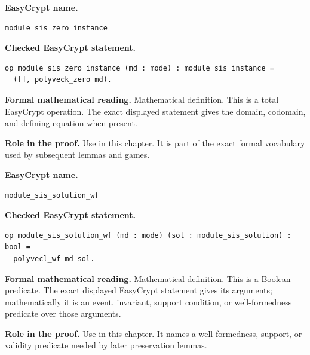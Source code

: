 \begin{formaldefinition}
\noindent\textbf{EasyCrypt name.}
\begin{lstlisting}[language=EasyCrypt,basicstyle=\ttfamily\scriptsize]
module_sis_zero_instance
\end{lstlisting}
\noindent\textbf{Checked EasyCrypt statement.}
\begin{lstlisting}[language=EasyCrypt,basicstyle=\ttfamily\scriptsize]
op module_sis_zero_instance (md : mode) : module_sis_instance =
  ([], polyveck_zero md).
\end{lstlisting}
\noindent\textbf{Formal mathematical reading.}
Mathematical definition. This is a total EasyCrypt operation.  The exact displayed statement gives the domain, codomain, and defining equation when present.

\noindent\textbf{Role in the proof.}
Use in this chapter. It is part of the exact formal vocabulary used by subsequent lemmas and games.

\end{formaldefinition}

\begin{formaldefinition}
\noindent\textbf{EasyCrypt name.}
\begin{lstlisting}[language=EasyCrypt,basicstyle=\ttfamily\scriptsize]
module_sis_solution_wf
\end{lstlisting}
\noindent\textbf{Checked EasyCrypt statement.}
\begin{lstlisting}[language=EasyCrypt,basicstyle=\ttfamily\scriptsize]
op module_sis_solution_wf (md : mode) (sol : module_sis_solution) : bool =
  polyvecl_wf md sol.
\end{lstlisting}
\noindent\textbf{Formal mathematical reading.}
Mathematical definition. This is a Boolean predicate.  The exact displayed EasyCrypt statement gives its arguments; mathematically it is an event, invariant, support condition, or well-formedness predicate over those arguments.

\noindent\textbf{Role in the proof.}
Use in this chapter. It names a well-formedness, support, or validity predicate needed by later preservation lemmas.

\end{formaldefinition}

